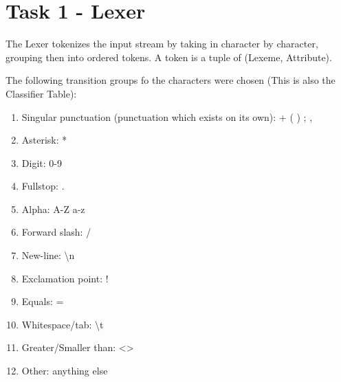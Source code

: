 \section{Task 1 - Lexer}
The Lexer tokenizes the input stream by taking in character by character, grouping then into ordered tokens. A token is a tuple of (Lexeme, Attribute).

The following transition groups fo the characters were chosen (This is also the Classifier Table):
\begin{enumerate}
	\item Singular punctuation (punctuation which exists on its own): + ( ) \textbraceleft \textbraceright ; ,
	\item Asterisk: *
	\item Digit: 0-9
	\item Fullstop: .
	\item Alpha: A-Z a-z \textunderscore
	\item Forward slash: /
	\item New-line: \textbackslash n
	\item Exclamation point: !
	\item Equals: =
	\item Whitespace/tab:   \textbackslash t
	\item Greater/Smaller than: \textless  \textgreater
	\item Other: anything else
\end{enumerate}

